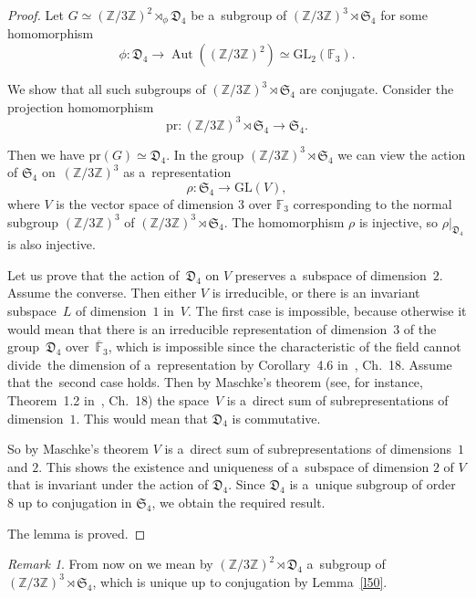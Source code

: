 \documentclass{amsart}
\numberwithin{equation}{section}
\theoremstyle{plain}
\theoremstyle{definition}
\theoremstyle{remark}
\newtheorem{remark}{Remark}
\begin{document}
\begin{proof}
Let $G \simeq (\mathbb{Z}/3\mathbb{Z})^2 \rtimes_{\phi} \mathfrak{D}_4$ be a~subgroup of $(\mathbb{Z}/3\mathbb{Z})^3 \rtimes \mathfrak{S}_4$ for some homomorphism
$$
\phi\colon \mathfrak{D}_4 \to \operatorname{Aut}( (\mathbb{Z}/3\mathbb{Z})^2 ) \simeq \mathrm{GL}_2(\mathbb{F}_3).
$$

We show that all such subgroups of $(\mathbb{Z}/3\mathbb{Z})^3 \rtimes \mathfrak{S}_4$ are conjugate. Consider the projection homomorphism
$$
\mathrm{pr} \colon (\mathbb{Z}/3\mathbb{Z})^3 \rtimes \mathfrak{S}_4 \to \mathfrak{S}_4.
$$

Then we have $\mathrm{pr}(G) \simeq \mathfrak{D}_4$. In the group $(\mathbb{Z}/3\mathbb{Z})^3 \rtimes \mathfrak{S}_4$ we can view the action of $\mathfrak{S}_4$ on~$(\mathbb{Z}/3\mathbb{Z})^3$ as a~representation
$$
\rho \colon \mathfrak{S}_4 \to \mathrm{GL}(V),
$$
where $V$ is the vector space of dimension $3$ over $\mathbb{F}_3$ corresponding to the normal subgroup $ (\mathbb{Z}/3\mathbb{Z})^3$ of $(\mathbb{Z}/3\mathbb{Z})^3 \rtimes \mathfrak{S}_4$. The homomorphism $\rho$ is injective, so $\rho |_{\mathfrak{D}_4}$ is also injective.

Let us prove that the action of~$\mathfrak{D}_4$ on $V$ preserves a~subspace of dimension~$2$. Assume the converse. Then either $V$ is irreducible, or there is an invariant subspace~$L$ of dimension~$1$ in~$V$. The first case is impossible, because otherwise it would mean that there is an irreducible representation of dimension~$3$ of the group~$\mathfrak{D}_4$ over~$\overline{\mathbb{F}}_3$, which is impossible since the characteristic of the field cannot divide~the dimension of a~representation by Corollary~4.6 in~\cite{12}, Ch.~18. Assume that the~second case holds. Then by Maschke's theorem (see, for instance, Theorem~1.2 in~\cite{12}, Ch.~18) the space~$V$ is a~direct sum of subrepresentations of dimension~$1$. This would mean that $\mathfrak{D}_4$ is commutative.

So by Maschke's theorem $V$ is a~direct sum of subrepresentations of dimensions~$1$ and $2$. This shows the existence and uniqueness of a~subspace of dimension $2$ of $V$ that is invariant under the action of $\mathfrak{D}_4$. Since $\mathfrak{D}_4$ is a~unique subgroup of order~$8$ up to conjugation in $\mathfrak{S}_4$, we obtain the required result.

The lemma is proved.
\end{proof}

\begin{remark}
\label{r6}
From now on we mean by $(\mathbb{Z}/3\mathbb{Z})^2 \rtimes \mathfrak{D}_4$ a~subgroup of $(\mathbb{Z}/3\mathbb{Z})^3 \rtimes \mathfrak{S}_4$, which is unique up to conjugation by Lemma~\ref{l50}.
\end{remark}
\end{document}
